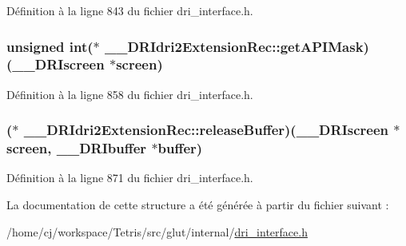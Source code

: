 Définition à la ligne 843 du fichier dri\-\_\-interface.\-h.

\hypertarget{struct_____d_r_idri2_extension_rec_a8d612e6a484c6fea44c5db910aaf79ce}{
\subsubsection[{get\-A\-P\-I\-Mask}]{\setlength{\rightskip}{0pt plus 5cm}unsigned int($\ast$ \-\_\-\-\_\-\-D\-R\-Idri2\-Extension\-Rec\-::get\-A\-P\-I\-Mask)({\bf \-\_\-\-\_\-\-D\-R\-Iscreen} $\ast$screen)}}\label{struct_____d_r_idri2_extension_rec_a8d612e6a484c6fea44c5db910aaf79ce}


Définition à la ligne 858 du fichier dri\-\_\-interface.\-h.

\hypertarget{struct_____d_r_idri2_extension_rec_a9650064568e324079bd79a01ea76bb2b}{
\subsubsection[{release\-Buffer}]{($\ast$ \-\_\-\-\_\-\-D\-R\-Idri2\-Extension\-Rec\-::release\-Buffer)({\bf \-\_\-\-\_\-\-D\-R\-Iscreen} $\ast$screen, {\bf \-\_\-\-\_\-\-D\-R\-Ibuffer} $\ast${\bf buffer})}}\label{struct_____d_r_idri2_extension_rec_a9650064568e324079bd79a01ea76bb2b}


Définition à la ligne 871 du fichier dri\-\_\-interface.\-h.



La documentation de cette structure a été générée à partir du fichier suivant \-:\begin{DoxyCompactItemize}
\item 
/home/cj/workspace/\-Tetris/src/glut/internal/\hyperlink{dri__interface_8h}{dri\-\_\-interface.\-h}\end{DoxyCompactItemize}
